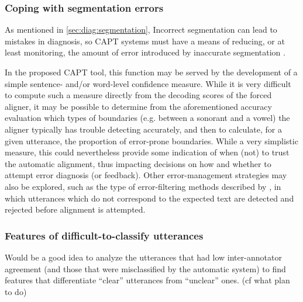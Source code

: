 
	\subsubsection{Coping with segmentation errors}

	\TODO{}
	
		
	
	As mentioned in \cref{sec:diag:segmentation}, 
	Incorrect segmentation can lead to mistakes in diagnosis, so CAPT systems must have a means of reducing, or at least monitoring, the amount of error introduced by inaccurate segmentation \citep{Eskenazi2009}. 
	
	In the proposed CAPT tool, this function may be served by the development of a simple sentence- and/or word-level confidence measure. 
	While it is very difficult to compute such a measure directly from the decoding scores of the forced aligner, it may be possible to determine from the aforementioned accuracy evaluation which types of boundaries (e.g. between a sonorant and a vowel) the aligner typically has trouble detecting accurately, and then to calculate, for a given utterance, the proportion of error-prone boundaries. While a very simplistic measure, this could nevertheless provide some indication of when (not) to trust the automatic alignment, thus impacting decisions on how and whether to attempt error diagnosis (or feedback).
	Other error-management strategies may also be explored, such as the type of error-filtering methods described by \textcite{Mesbahi2011,Bonneau2012,Orosanu2012}, in which utterances which do not correspond to the expected text are detected and rejected before alignment is attempted.
	
	
	
	
	
	\subsubsection{Features of difficult-to-classify utterances}
	Would be a good idea to analyze the utterances that had low inter-annotator agreement (and those that were misclassified by the automatic system) to find features that differentiate ``clear'' utterances from ``unclear'' ones. (cf what \textcite{Michaux2013} plan to do)
	
